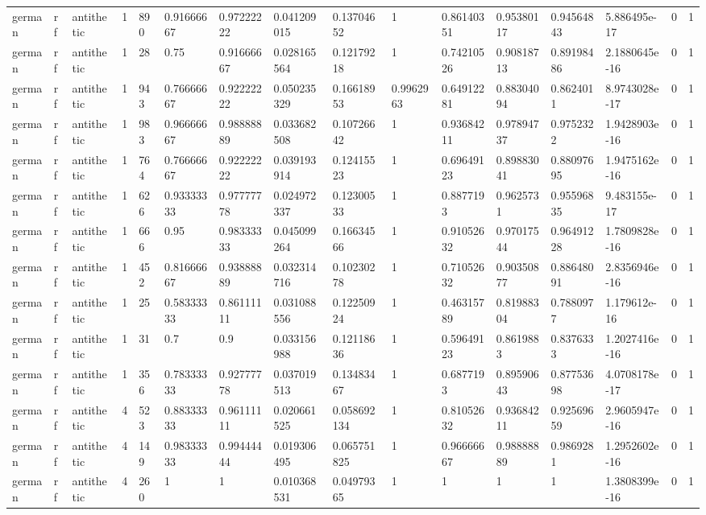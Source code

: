 \begin{tabular}{llllllllllllllll}
german & rf & antithetic & 1 & 890 & 0.91666667 & 0.97222222 & 0.041209015 & 0.13704652 & 1 & 0.86140351 & 0.95380117 & 0.94564843 & 5.886495e-17 & 0 & 1 \\
german & rf & antithetic & 1 & 28 & 0.75 & 0.91666667 & 0.028165564 & 0.12179218 & 1 & 0.74210526 & 0.90818713 & 0.89198486 & 2.1880645e-16 & 0 & 1 \\
german & rf & antithetic & 1 & 943 & 0.76666667 & 0.92222222 & 0.050235329 & 0.16618953 & 0.9962963 & 0.64912281 & 0.88304094 & 0.8624011 & 8.9743028e-17 & 0 & 1 \\
german & rf & antithetic & 1 & 983 & 0.96666667 & 0.98888889 & 0.033682508 & 0.10726642 & 1 & 0.93684211 & 0.97894737 & 0.9752322 & 1.9428903e-16 & 0 & 1 \\
german & rf & antithetic & 1 & 764 & 0.76666667 & 0.92222222 & 0.039193914 & 0.12415523 & 1 & 0.69649123 & 0.89883041 & 0.88097695 & 1.9475162e-16 & 0 & 1 \\
german & rf & antithetic & 1 & 626 & 0.93333333 & 0.97777778 & 0.024972337 & 0.12300533 & 1 & 0.8877193 & 0.9625731 & 0.95596835 & 9.483155e-17 & 0 & 1 \\
german & rf & antithetic & 1 & 666 & 0.95 & 0.98333333 & 0.045099264 & 0.16634566 & 1 & 0.91052632 & 0.97017544 & 0.96491228 & 1.7809828e-16 & 0 & 1 \\
german & rf & antithetic & 1 & 452 & 0.81666667 & 0.93888889 & 0.032314716 & 0.10230278 & 1 & 0.71052632 & 0.90350877 & 0.88648091 & 2.8356946e-16 & 0 & 1 \\
german & rf & antithetic & 1 & 25 & 0.58333333 & 0.86111111 & 0.031088556 & 0.12250924 & 1 & 0.46315789 & 0.81988304 & 0.7880977 & 1.179612e-16 & 0 & 1 \\
german & rf & antithetic & 1 & 31 & 0.7 & 0.9 & 0.033156988 & 0.12118636 & 1 & 0.59649123 & 0.8619883 & 0.8376333 & 1.2027416e-16 & 0 & 1 \\
german & rf & antithetic & 1 & 356 & 0.78333333 & 0.92777778 & 0.037019513 & 0.13483467 & 1 & 0.6877193 & 0.89590643 & 0.87753698 & 4.0708178e-17 & 0 & 1 \\
german & rf & antithetic & 4 & 523 & 0.88333333 & 0.96111111 & 0.020661525 & 0.058692134 & 1 & 0.81052632 & 0.93684211 & 0.92569659 & 2.9605947e-16 & 0 & 1 \\
german & rf & antithetic & 4 & 149 & 0.98333333 & 0.99444444 & 0.019306495 & 0.065751825 & 1 & 0.96666667 & 0.98888889 & 0.9869281 & 1.2952602e-16 & 0 & 1 \\
german & rf & antithetic & 4 & 260 & 1 & 1 & 0.010368531 & 0.04979365 & 1 & 1 & 1 & 1 & 1.3808399e-16 & 0 & 1 \\

\end{tabular}
